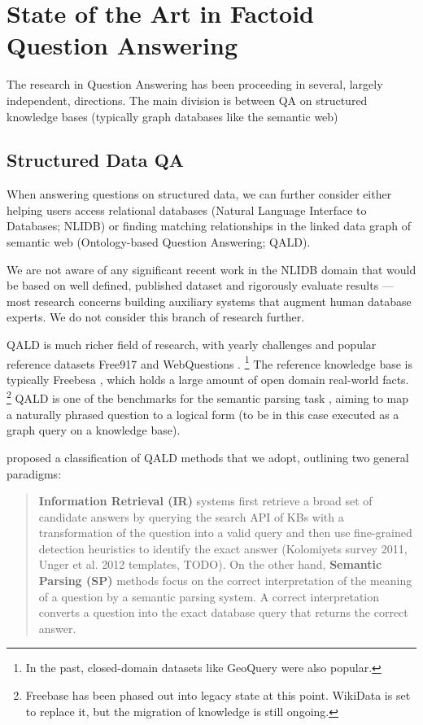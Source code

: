 \chapter{State of the Art in Factoid Question Answering}
\label{ch:survey}

The research in Question Answering has been proceeding in several,
largely independent, directions.  The main division is between QA
on structured knowledge bases (typically graph databases like the
semantic web)


\section{Structured Data QA}
\label{sec:structured}

When answering questions on structured data, we can further
consider either helping users access relational databases (Natural Language Interface to Databases; NLIDB)
or finding matching relationships in the linked data graph of semantic web (Ontology-based Question Answering; QALD).

We are not aware of any significant recent work in the NLIDB domain
that would be based on well defined, published dataset and rigorously
evaluate results --- most research concerns building auxiliary systems
that augment human database experts. \citep{BergamaschiKeymantic, BlunschiSODA}
We do not consider this branch of research further.

QALD is much richer field of research, with yearly challenges \citep{QALD} and
popular reference datasets Free917 \citep{Free917} and WebQuestions \citep{WebQuestions}.%
\footnote{In the past, closed-domain datasets like GeoQuery were also popular.}
The reference knowledge base is typically Freebesa \citep{Freebase},
which holds a large amount of open domain real-world facts.%
\footnote{Freebase has been phased out into legacy state at this point.
	WikiData is set to replace it, but the migration of knowledge
	is still ongoing.}
QALD is one of the benchmarks for the semantic parsing task \citep{SPIntro}, aiming
to map a naturally phrased question to a logical form (to be in this case
executed as a graph query on a knowledge base).
\citep{SPBerant2014Paraphrase, Semantic2014Bordes}

\citep{Semantic2014Bordes} proposed a classification of QALD methods
that we adopt, outlining two general paradigms:

\begin{quote}
\textbf{Information
Retrieval (IR)} systems first retrieve a broad set of candidate answers by querying
the search API of KBs with a transformation of the question into a valid
query and then use fine-grained detection heuristics to identify the exact answer
(Kolomiyets survey 2011, Unger et al. 2012 templates, \citep{TreeFreebase2014Yao} TODO).
On the other hand, \textbf{Semantic Parsing (SP)} methods focus on the correct
interpretation of the meaning of a question by a semantic parsing system. A
correct interpretation converts a question into the exact database query that
returns the correct answer. \citep{Semantic2013Berant, SPBerant2014Paraphrase, OQA}
\end{quote}

